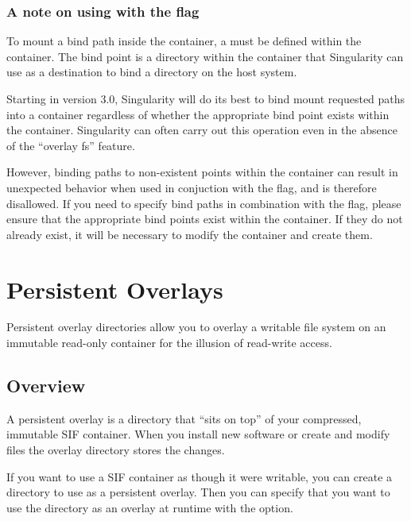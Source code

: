\documentclass[letterpaper,10pt,english]{sphinxmanual}
\begin{document}
\subsection{A note on using  with the  flag}
\label{\detokenize{bind_paths_and_mounts:a-note-on-using-bind-with-the-writable-flag}}
To mount a bind path inside the container, a  must be defined
within the container. The bind point is a directory within the container that
Singularity can use as a destination to bind a directory on the host system.

Starting in version 3.0, Singularity will do its best to bind mount requested
paths into a container regardless of whether the appropriate bind point exists
within the container.  Singularity can often carry out this operation even in
the absence of the “overlay fs” feature.

However, binding paths to non-existent points within the container can result in
unexpected behavior when used in conjuction with the  flag, and is
therefore disallowed. If you need to specify bind paths in combination with the
 flag, please ensure that the appropriate bind points exist within
the container. If they do not already exist, it will be necessary to modify the
container and create them.


\chapter{Persistent Overlays}
\label{\detokenize{persistent_overlays:persistent-overlays}}\label{\detokenize{persistent_overlays::doc}}
Persistent overlay directories allow you to overlay a writable file system on an
immutable read-only container for the illusion of read-write access.


\section{Overview}
\label{\detokenize{persistent_overlays:overview}}
A persistent overlay is a directory that “sits on top” of your compressed,
immutable SIF container. When you install new software or create and modify
files the overlay directory stores the changes.

If you want to use a SIF container as though it were writable, you can create a
directory to use as a persistent overlay. Then you can specify that you want to
use the directory as an overlay at runtime with the  option.
\end{document}
